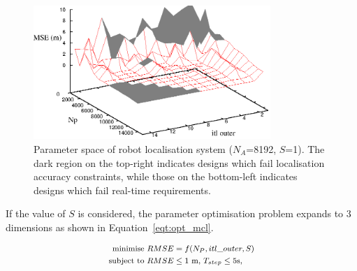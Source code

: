 \begin{figure}[t!]
\begin{center}
\includegraphics[width=0.8\textwidth]{design_flow/figures/fig_mcl_2d}
\end{center}
\caption{Parameter space of robot localisation system ($N_A$=8192, $S$=1). The dark region on the top-right indicates designs which fail localisation accuracy constraints, while those on the bottom-left indicates designs which fail real-time requirements.}
\label{fig:mcl_2d}
\end{figure}

If the value of $S$ is considered, the parameter optimisation problem expands to 3 dimensions as shown in Equation~\ref{eqt:opt_mcl}.

\begin{equation}
\footnotesize
\begin{aligned}
\mbox{minimise } RMSE &= f(N_P, itl\_outer, S) \\
\mbox{subject to } RMSE & \leq \mbox{1 m, } T_{step} \leq \mbox{5s, } \\
\end{aligned}
\label{eqt:opt_mcl}
\end{equation}



